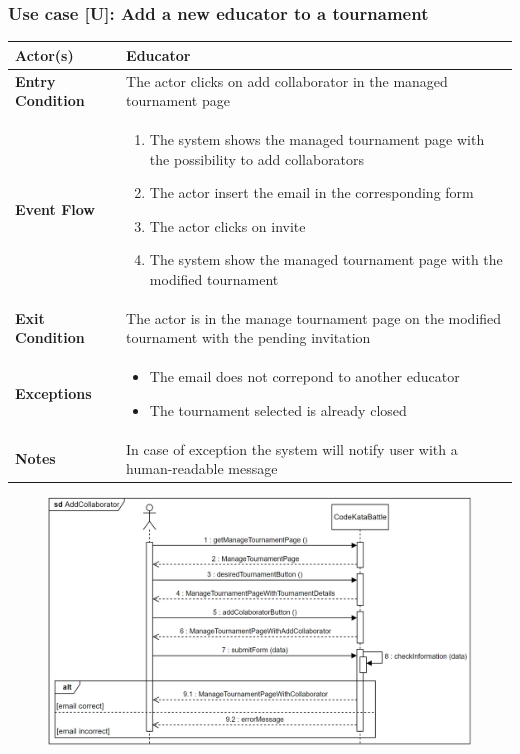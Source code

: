 \documentclass[12pt, a4paper]{report}
\newcounter{useCase}
\newcommand{\usecase}[9]{
    \def\arraystretch{1.5} 
    \subsubsection*{Use case [U#2]: #3}
    \vspace*{0.2cm}
    \begin{center}
        \begin{tabular}{|l|p{12cm}|}
            \hline
            \textbf{Actor(s)} & #4 \\
            \hline
            \textbf{Entry Condition} & #5 \\
            \hline
            \textbf{Event Flow} & #6 \\
            \hline
            \textbf{Exit Condition} & #7 \\
            \hline
            \textbf{Exceptions} & #8 \\
            \hline
            \textbf{Notes} & #9 \\
            \hline
        \end{tabular}
    \end{center}
    #1
}
\begin{document}
        \usecase{\begin{figure}[H]\centering\includegraphics[width=0.9\linewidth]{images/addcollaborator.png}\end{figure}}        
        {\arabic{useCase}\stepcounter{useCase}}
        {Add a new educator to a tournament}
        {Educator}
        {The actor clicks on add collaborator in the managed tournament page}
        {
        \begin{enumerate}
            \item The system shows the managed tournament page with the possibility to add collaborators
            \item The actor insert the email in the corresponding form
            \item The actor clicks on invite
            \item The system show the managed tournament page with the modified tournament
        \end{enumerate}
        }
        {The actor is in the manage tournament page on the modified tournament with the pending invitation}
        {
        \begin{itemize}
            \item The email does not correpond to another educator 
            \item The tournament selected is already closed 
        \end{itemize}
        }
        {In case of exception the system will notify user with a human-readable message}
\end{document}
